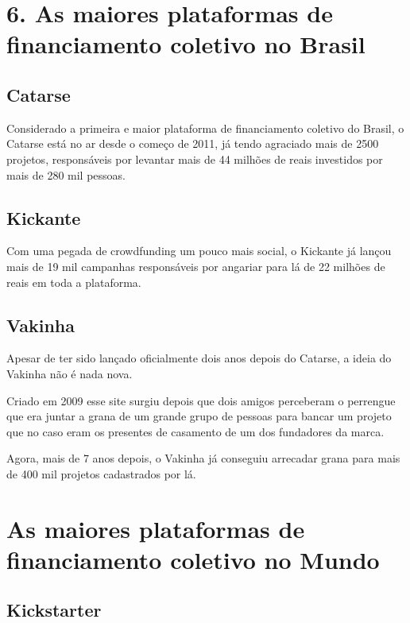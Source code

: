 \documentclass{classe_cn}                 %
\begin{document}
\section{6. As maiores plataformas de financiamento coletivo no Brasil}

\subsection{Catarse}

Considerado a primeira e maior plataforma de financiamento coletivo do Brasil, o Catarse está no ar desde o começo de 2011, já tendo agraciado mais de 2500 projetos, responsáveis por levantar mais de 44 milhões de reais investidos por mais de 280 mil pessoas.

\subsection{Kickante}

Com uma pegada de crowdfunding um pouco mais social, o Kickante já lançou mais de 19 mil campanhas responsáveis por angariar para lá de 22 milhões de reais em toda a plataforma.

\subsection{Vakinha}

Apesar de ter sido lançado oficialmente dois anos depois do Catarse, a ideia do Vakinha não é nada nova.

Criado em 2009 esse site surgiu depois que dois amigos perceberam o perrengue que era juntar a grana de um grande grupo de pessoas para bancar um projeto que no caso eram os presentes de casamento de um dos fundadores da marca.

Agora, mais de 7 anos depois, o Vakinha já conseguiu arrecadar grana para mais de 400 mil projetos cadastrados por lá.

\section{As maiores plataformas de financiamento coletivo no Mundo}

\subsection{Kickstarter}
\end{document}
